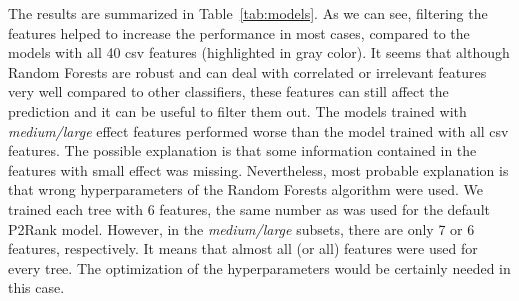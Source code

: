 The results are summarized in Table~\ref{tab:models}. As we can see, filtering the features helped to increase the performance in most cases, compared to the models with all 40 csv features (highlighted in gray color). It seems that although Random Forests are robust and can deal with correlated or irrelevant features very well compared to other classifiers, these features can still affect the prediction and it can be useful to filter them out. The models trained with \textit{medium/large} effect features performed worse than the model trained with all csv features. The possible explanation is that some information contained in the features with small effect was missing. Nevertheless, most probable explanation is that wrong hyperparameters of the Random Forests algorithm were used. We trained each tree with 6 features, the same number as was used for the default P2Rank model.  However, in the \textit{medium/large} subsets, there are only 7 or 6 features, respectively. It means that almost all (or all) features were used for every tree. The optimization of the hyperparameters would be certainly needed in this case.


